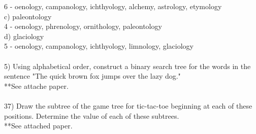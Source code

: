 \documentclass{article}
\begin{document}
\begin{flushleft}
\setlength\parindent{48pt} 6 - oenology, campanology, ichthyology, alchemy, astrology, etymology \\
\setlength\parindent{24pt}c) paleontology \\ 
\setlength\parindent{48pt} 4 - oenology, phrenology, ornithology, paleontology \\
\setlength\parindent{24pt}d) glaciology \\
\setlength\parindent{48pt} 5 - oenology, campanology, ichthyology, limnology, glaciology \\
~\\
\setlength\parindent{0pt}5) Using alphabetical order, construct a binary search tree for the words in the sentence "The quick brown fox jumps over the lazy dog." \\
**See attache paper. \\
~\\
\setlength\parindent{0pt}37) Draw the subtree of the game tree for tic-tac-toe beginning at each of these positions.  Determine the value of each of these subtrees. \\
**See attached paper. \\

\end{flushleft}
\end{document}
